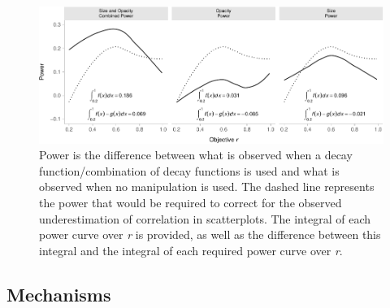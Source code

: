 \documentclass[manuscript, review, anonymous, screen]{acmart}
\begin{document}
\begin{figure}

{\centering \includegraphics[width=1\textwidth,height=\textheight]{size_and_opacity_files/figure-pdf/fig-power-plot-1.pdf}

}

\caption{\label{fig-power-plot}Power is the difference between what is
observed when a decay function/combination of decay functions is used
and what is observed when no manipulation is used. The dashed line
represents the power that would be required to correct for the observed
underestimation of correlation in scatterplots. The integral of each
power curve over \textit{r} is provided, as well as the difference
between this integral and the integral of each required power curve over
\textit{r}.}

\end{figure}

\hypertarget{sec-mechs}{%
\subsection{Mechanisms}\label{sec-mechs}}
\end{document}
